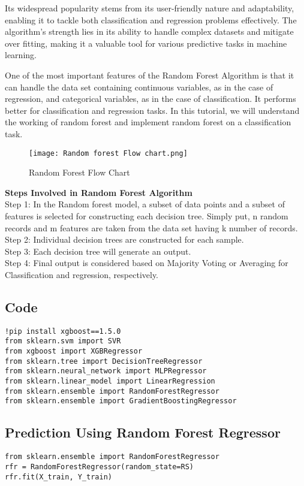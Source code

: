 \documentclass[12pt,a4paper]{report}
\begin{document}
Its widespread popularity stems from its user-friendly nature and adaptability, enabling it to tackle both classification and regression problems effectively. The algorithm’s strength lies in its ability to handle complex datasets and mitigate over fitting, making it a valuable tool for various predictive tasks in machine learning.

One of the most important features of the Random Forest Algorithm is that it can handle the data set containing continuous variables, as in the case of regression, and categorical variables, as in the case of classification. It performs better for classification and regression tasks. In this tutorial, we will understand the working of random forest and implement random forest on a classification task.
\begin{figure} [!ht]
    \centering
    \texttt{[image: Random forest Flow chart.png]}
    \caption{Random Forest Flow Chart}
    \label{fig:enter-label}
\end{figure}
\textbf{Steps Involved in Random Forest Algorithm}\\
Step 1: In the Random forest model, a subset of data points and a subset of features is selected for constructing each decision tree. Simply put, n random records and m features are taken from the data set having k number of records.\\
Step 2: Individual decision trees are constructed for each sample.\\
Step 3: Each decision tree will generate an output.\\
Step 4: Final output is considered based on Majority Voting or Averaging for Classification and regression, respectively.
\subsection{Code}
\begin{lstlisting}
!pip install xgboost==1.5.0 
from sklearn.svm import SVR 
from xgboost import XGBRegressor 
from sklearn.tree import DecisionTreeRegressor 
from sklearn.neural_network import MLPRegressor 
from sklearn.linear_model import LinearRegression 
from sklearn.ensemble import RandomForestRegressor 
from sklearn.ensemble import GradientBoostingRegressor 
\end{lstlisting}
\subsection{Prediction Using Random Forest Regressor}
\begin{lstlisting}
from sklearn.ensemble import RandomForestRegressor 
rfr = RandomForestRegressor(random_state=RS)
rfr.fit(X_train, Y_train)
\end{lstlisting}
\end{document}
